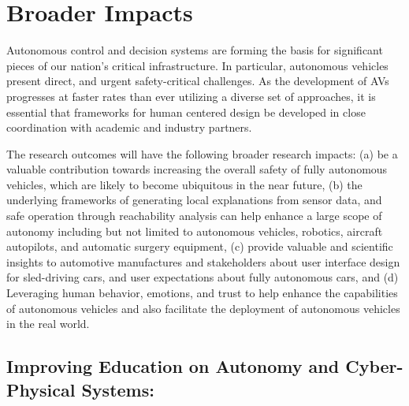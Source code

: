 \section{Broader Impacts}
\label{sec:broader}

Autonomous control and decision systems are forming the basis for significant pieces of our nation’s critical infrastructure. In particular, autonomous vehicles present direct, and urgent safety-critical challenges. 
As the development of AVs progresses at faster rates than ever utilizing a diverse set of approaches, it is essential that frameworks for human centered design be developed in close coordination with academic and industry partners. 

The research outcomes will have the following broader research impacts: (a) be a valuable contribution towards increasing the overall safety of fully autonomous vehicles, which are likely to become ubiquitous in the near future, (b) the underlying frameworks of generating local explanations from sensor data, and safe operation through reachability analysis can help enhance a large scope of autonomy including but not limited to autonomous vehicles, robotics, aircraft autopilots, and automatic surgery equipment, 
(c) provide valuable and scientific insights to automotive manufactures and stakeholders about user interface design for sled-driving cars, and user expectations about fully autonomous cars, and (d) Leveraging human behavior, emotions, and trust to help enhance the capabilities of autonomous vehicles and also facilitate the deployment of autonomous vehicles in the real world.

\subsection{Improving Education on Autonomy and Cyber-Physical Systems:}

